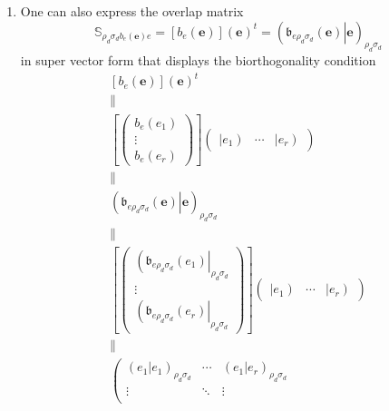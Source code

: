 \documentclass[aps,preprint]{revtex4}
\begin{document}
\begin{enumerate}
\begin{enumerate}
\item One can also express the overlap matrix 
\begin{equation}
\mathbb{S}_{\rho _{d}\sigma _{d}b_{e}\left( \boldsymbol{e}\right) e}=\left[
b_{e}\left( \boldsymbol{e}\right) \right] \left( \boldsymbol{e}\right)
^{t}=\left( \left. \mathfrak{b}_{e\rho _{d}\sigma _{d}}\left( \boldsymbol{e}%
\right) \right\vert \boldsymbol{e}\right) _{\rho _{d}\sigma _{d}}
\end{equation}%
in super vector form that displays the biorthogonality condition 
\begin{gather}
\left[ b_{e}\left( \boldsymbol{e}\right) \right] \left( \boldsymbol{e}%
\right) ^{t} \\
\parallel \\
\left[ \left( 
\begin{array}{c}
b_{e}\left( e_{1}\right) \\ 
\vdots \\ 
b_{e}\left( e_{r}\right)%
\end{array}%
\right) \right] \left( 
\begin{array}{ccc}
\left\vert e_{1}\right) & \cdots & \left\vert e_{r}\right)%
\end{array}%
\right) \\
\parallel \\
\left( \left. \mathfrak{b}_{e\rho _{d}\sigma _{d}}\left( \boldsymbol{e}%
\right) \right\vert \boldsymbol{e}\right) _{\rho _{d}\sigma _{d}} \\
\parallel \\
\left[ \left( 
\begin{array}{c}
\left( \mathfrak{b}_{e\rho _{d}\sigma _{d}}\left( e_{1}\right) \right\vert
_{\rho _{d}\sigma _{d}} \\ 
\vdots \\ 
\left( \mathfrak{b}_{e\rho _{d}\sigma _{d}}\left( e_{r}\right) \right\vert
_{\rho _{d}\sigma _{d}}%
\end{array}%
\right) \right] \left( 
\begin{array}{ccc}
\left\vert e_{1}\right) & \cdots & \left\vert e_{r}\right)%
\end{array}%
\right) \\
\parallel \\
\left( 
\begin{array}{ccc}
\left( \left. e_{1}\right\vert e_{1}\right) _{\rho _{d}\sigma _{d}} & \cdots
& \left( \left. e_{1}\right\vert e_{r}\right) _{\rho _{d}\sigma _{d}} \\ 
\vdots & \ddots & \vdots \\ 

\end{array}
\end{gather}
\end{enumerate}
\end{enumerate}
\end{document}
